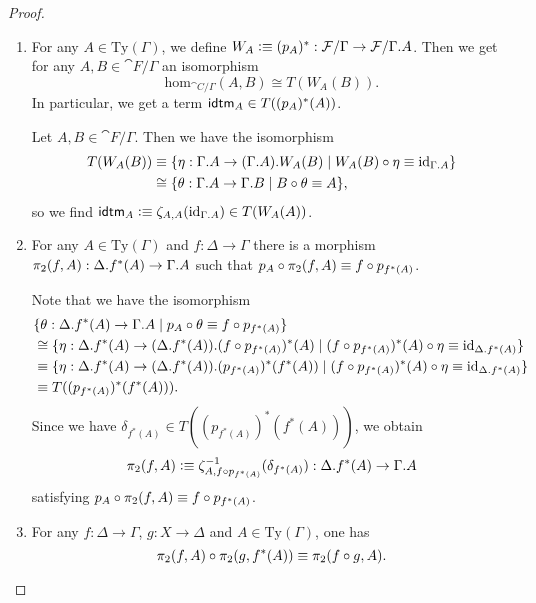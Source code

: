 \begin{proof}
\begin{enumerate}
\item
For any $A\in\mathrm{Ty}(\Gamma)$, we define
$W_A\defeq (p_A)^\ast:\cat{F}/\Gamma\to\cat{F}/\ctxext{\Gamma}{A}$. Then we get
for any $A,B\in\cat{F}/\Gamma$ an isomorphism
\begin{equation*}
\mathrm{hom}_{\cat{C}/\Gamma}(A,B)
  \cong
T(W_A(B)).
\end{equation*}
In particular, we get a term $\idtm{A}\in T((p_A)^\ast(A))$. 
\medskip

Let $A,B\in\cat{F}/\Gamma$. Then we have the isomorphism
\begin{align*}
T(W_A(B)) & \jdeq \{\eta:\ctxext{\Gamma}{A}\to\ctxext{{\Gamma}{A}}{W_A(B)}\mid W_A(B)\circ\eta\jdeq\catid{\ctxext{\Gamma}{A}}\} \\
  & \cong
\{\theta:\ctxext{\Gamma}{A}\to\ctxext{\Gamma}{B}\mid B\circ\theta\jdeq A\},
\end{align*}
so we find $\idtm{A}\defeq\zeta_{A,A}(\catid{\ctxext{\Gamma}{A}})\in T(W_A(A))$.

\item For any $A\in\mathrm{Ty}(\Gamma)$ and $f:\Delta\to\Gamma$ 
there is a morphism $\pi_2(f,A):\ctxext{\Delta}{f^\ast(A)}\to\ctxext{\Gamma}{A}$
such that $p_A\circ \pi_2(f,A)\equiv f\circ p_{f^\ast(A)}$.

\medskip
Note that we have the isomorphism
\begin{align*}
& \{ \theta : \ctxext{\Delta}{f^\ast(A)}\to\ctxext{\Gamma}{A}\mid p_A\circ\theta\jdeq f\circ p_{f^\ast(A)} \} \\
  & \cong
\{ \eta : \ctxext{\Delta}{f^\ast(A)}\to\ctxext{{\Delta}{f^\ast(A)}}{(f\circ p_{f^\ast(A)})^\ast(A)}
  \mid (f\circ p_{f^\ast(A)})^\ast(A)\circ\eta\jdeq\catid{\ctxext{\Delta}{f^\ast(A)}}\} \\
  & \jdeq
\{ \eta : \ctxext{\Delta}{f^\ast(A)}\to\ctxext{{\Delta}{f^\ast(A)}}{(p_{f^\ast(A)})^\ast(f^\ast(A))}
  \mid (f\circ p_{f^\ast(A)})^\ast(A)\circ\eta\jdeq\catid{\ctxext{\Delta}{f^\ast(A)}}\} \\
  & \jdeq
T((p_{f^\ast(A)})^\ast(f^\ast(A))).
\end{align*}
Since we have $\delta_{f^\ast(A)}\in T((p_{f^\ast(A)})^\ast(f^\ast(A)))$, we obtain 
\begin{equation*}
\pi_2(f,A)\defeq \zeta_{A,f\circ p_{f^\ast(A)}}^{-1}(\delta_{f^\ast(A)}):\ctxext{\Delta}{f^\ast(A)}\to\ctxext{\Gamma}{A}
\end{equation*}
satisfying $p_A\circ\pi_2(f,A)\equiv f\circ p_{f^\ast(A)}$.
\item For any $f:\Delta\to\Gamma$, $g:X\to\Delta$ and $A\in\mathrm{Ty}(\Gamma)$, one has
\begin{equation*}
\pi_2(f,A)\circ\pi_2(g,f^\ast(A))\equiv\pi_2(f\circ g,A).
\end{equation*}


\end{enumerate}
\end{proof}
